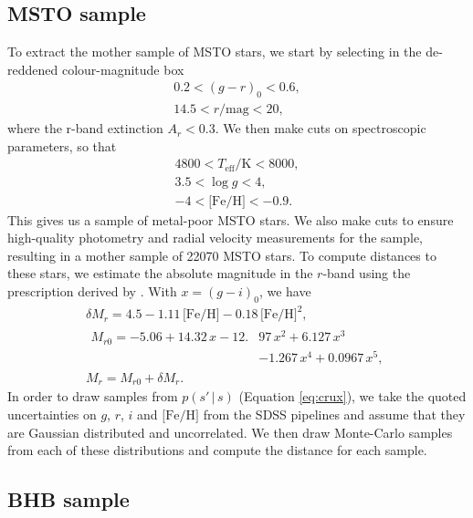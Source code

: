 \documentclass[useAMS,twocolumn,usenatbib]{mn2e}
\begin{document}
\subsection{MSTO sample}

To extract the mother sample of MSTO stars, we start by selecting in the de-reddened colour-magnitude box
%
\begin{gather}
0.2 < (g-r)_0 < 0.6, \nonumber \\
14.5 < r/\mathrm{mag} < 20,
\end{gather}
%
where the r-band extinction $A_r<0.3$. We then make cuts on spectroscopic parameters, so that
%
\begin{gather}
4800 < T_{\mathrm{eff}}/\mathrm{K} < 8000, \nonumber \\
3.5 < \log g < 4, \nonumber \\
-4 < \mathrm{\lbrack Fe/H \rbrack} < -0.9.
\end{gather}
% 
This gives us a sample of metal-poor MSTO stars. 
We also make cuts to ensure high-quality photometry and radial velocity measurements for the sample, resulting in a mother sample of 22070 MSTO stars. 
To compute distances to these stars, we estimate the absolute magnitude in the $r$-band using the prescription derived by \cite{Iv08}. 
With $x=(g-i)_0$, we have
%
\begin{gather}
\delta M_r = 4.5 - 1.11\,\lbrack \mathrm{Fe/H} \rbrack -0.18\,\lbrack \mathrm{Fe/H} \rbrack^2, \nonumber \\
\begin{split}
M_{r0} = -5.06 + 14.32\,x - 12.{}&97\,x^2 + 6.127\,x^3 \nonumber \\
                    {}&- 1.267\,x^4 + 0.0967\,x^5,
\end{split}\\
M_r = M_{r0} + \delta M_r.
\end{gather}
% 
In order to draw samples from $p(s' \,|\, s)$ (Equation \ref{eq:crux}), we take the quoted uncertainties on $g$, $r$, $i$ and $\lbrack \mathrm{Fe/H} \rbrack$ from the SDSS pipelines and assume that they are Gaussian distributed and uncorrelated. 
We then draw Monte-Carlo samples from each of these distributions and compute the distance for each sample.

\subsection{BHB sample}
\end{document}
